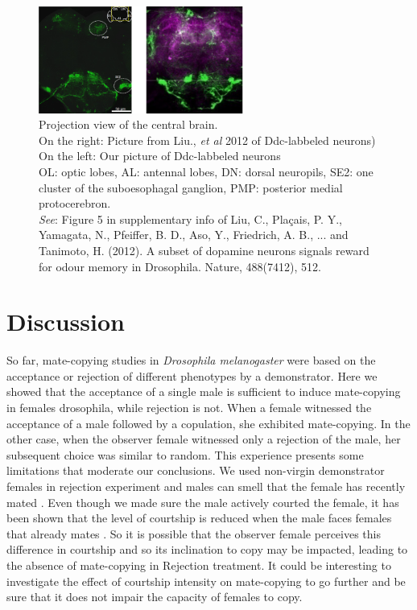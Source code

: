 \documentclass[a4paper, 12pt]{article}
\begin{document}
\begin{figure}
	\centering
	\includegraphics[width=0.6\textwidth]{images/micro}
	\caption{Projection view of the central brain. \\
		On the right: Picture from Liu., \textit{et al} 2012 of Ddc-labbeled neurons)\\
		On the left: Our picture of Ddc-labbeled neurons\\
		OL: optic lobes,
		AL: antennal lobes,
		DN: dorsal neuropils,
		SE2: one cluster of the suboesophagal ganglion,
		PMP: posterior medial protocerebron.\\
	\textit{See}: Figure 5 in supplementary info of Liu, C., Plaçais, P. Y., Yamagata, N., Pfeiffer, B. D., Aso, Y., Friedrich, A. B., ... and Tanimoto, H. (2012). A subset of dopamine neurons signals reward for odour memory in Drosophila. Nature, 488(7412), 512.}
	\label{fig:micro}
\end{figure}

	


\section{Discussion}

So far, mate-copying studies in \textit{Drosophila melanogaster} were based on the acceptance or rejection of different phenotypes by a demonstrator.
Here we showed that the acceptance of a single male is sufficient to induce mate-copying in females drosophila, while rejection is not.
When a female witnessed the acceptance of a male followed by a copulation, she exhibited mate-copying.
In the other case, when the observer female witnessed only a rejection of the male, her subsequent choice was similar to random.
This experience presents some limitations that moderate our conclusions. We used non-virgin demonstrator females in rejection experiment and males can smell that the female has recently mated \parencite{jallon_few_1984}. Even though we made sure the male actively courted the female, it has been shown that the level of courtship is reduced when the male faces females that already mates \parencite{cook_attractiveness_1975, tompkins_conditioned_1983}.
So it is possible that the observer female perceives this difference in courtship and so its inclination to copy may be impacted, leading to the absence of mate-copying in Rejection treatment. It could be interesting to investigate the effect of courtship intensity on mate-copying to go further and be sure that it does not impair the capacity of females to copy.
\end{document}
